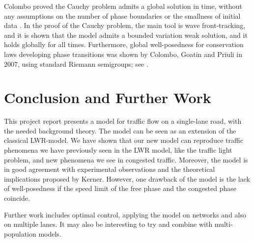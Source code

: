 \documentclass[10pt]{article}
\numberwithin{equation}{section}
\begin{document}
Colombo proved the Cauchy problem admits a global solution in time, without any assumptions on the number of phase boundaries or the smallness of initial data \cite{Colombo2003}. In the proof of the Cauchy problem, the main tool is wave front-tracking, and it is shown that the model admits a bounded variation weak solution, and it holds globally for all times. Furthermore, global well-posedness for conservation laws developing phase transitions was shown by Colombo, Goatin and Priuli in $2007$, using standard Riemann semigroups; see  \cite{ColomboGoatinPriuli}. 


\section{Conclusion and Further Work}
This project report presents a model for traffic flow on a single-lane road, with the needed background theory. The model can be seen as an extension of the classical LWR-model. We have shown that our new model can reproduce traffic phenomena we have previously seen in the LWR model, like the traffic light problem, and new phenomena we see in congested traffic.  Moreover, the model is in good agreement with experimental observations and the theoretical implications proposed by Kerner.  However, one drawback of the model is the lack of well-posedness if the speed limit of the free phase and the congested phase coincide. 

Further work includes optimal control, applying the model on networks and also on multiple lanes. It may also be interesting to try and combine with multi-population models. 

\newpage

\printbibliography
\end{document}
